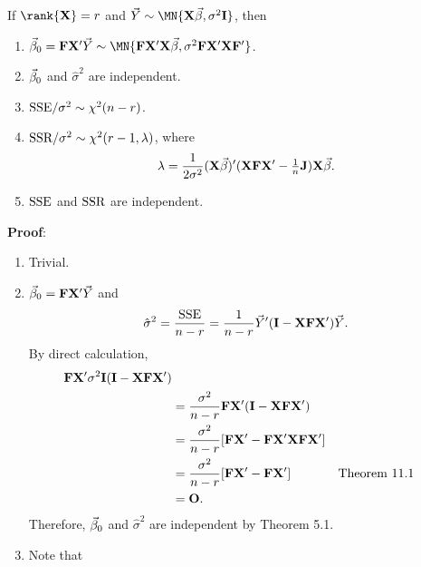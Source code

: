 \begin{Theorem}{}{}
    If $ \rank{\Matrix{X}}=r $
    and $ \Vector{Y}\sim \MN{\Matrix{X}\Vector{\beta},\sigma^2 \Matrix{I}} $, then
    \begin{enumerate}[(1)]
        \item $ \Vector{\beta}_0=\Matrix{F}\Matrix{X}'\Vector{Y}\sim \MN{\Matrix{F}\Matrix{X}'\Matrix{X}\Vector{\beta},\sigma^2 \Matrix{F}\Matrix{X}'\Matrix{X}\Matrix{F}'} $.
        \item $ \vec{\beta}_0 $ and $ \hat{\sigma}^2 $ are independent.
        \item $ \text{SSE}/\sigma^2 \sim \chi^2(n-r) $.
        \item $ \text{SSR}/\sigma^2 \sim \chi^2(r-1,\lambda) $, where
              \[ \lambda = \frac{1}{2\sigma^2}(\mathbf{X}\vec{\beta})'(\mathbf{X}\mathbf{F}\mathbf{X}'-\tfrac{1}{n}\mathbf{J})\mathbf{X}\vec{\beta}. \]
        \item $ \text{SSE} $ and $ \text{SSR} $ are independent.
    \end{enumerate}
    \tcblower{}
    \textbf{Proof}:
    \begin{enumerate}[(1)]
        \item Trivial.
        \item $ \vec{\beta}_0=\mathbf{F}\mathbf{X}'\vec{Y} $
              and
              \[ \hat{\sigma}^2=\frac{\text{SSE}}{n-r}=\frac{1}{n-r}\vec{Y}'(\mathbf{I}-\mathbf{X}\mathbf{F}\mathbf{X}')\vec{Y}. \]
              By direct calculation,
              \begin{align*}
                  \mathbf{F}\mathbf{X}'\sigma^2 \mathbf{I}(\mathbf{I}-\mathbf{X}\mathbf{F}\mathbf{X}')                                          \\
                   & =\frac{\sigma^2}{n-r}\mathbf{F}\mathbf{X}'(\mathbf{I}-\mathbf{X}\mathbf{F}\mathbf{X}')                                     \\
                   & =\frac{\sigma^2}{n-r}[\mathbf{F}\mathbf{X}'-\mathbf{F}\mathbf{X}'\mathbf{X}\mathbf{F}\mathbf{X}']                          \\
                   & =\frac{\sigma^2}{n-r}[\mathbf{F}\mathbf{X}'-\mathbf{F}\mathbf{X}']                                &  & \text{Theorem 11.1} \\
                   & =\mathbf{O}.
              \end{align*}
              Therefore, $ \vec{\beta}_0 $ and  $ \hat{\sigma}^2 $ are independent by Theorem 5.1.
        \item Note that

\end{enumerate}
\end{Theorem}
